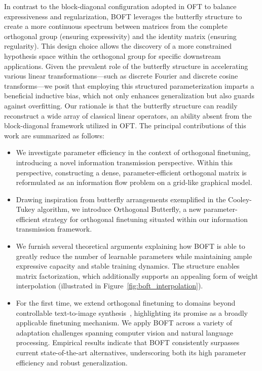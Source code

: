 In contrast to the block-diagonal configuration adopted in OFT to balance expressiveness and regularization, BOFT leverages the butterfly structure to create a more continuous spectrum between matrices from the complete orthogonal group (ensuring expressivity) and the identity matrix (ensuring regularity). This design choice allows the discovery of a more constrained hypothesis space within the orthogonal group for specific downstream applications. Given the prevalent role of the butterfly structure in accelerating various linear transformations—such as discrete Fourier and discrete cosine transforms—we posit that employing this structured parameterization imparts a beneficial inductive bias, which not only enhances generalization but also guards against overfitting. Our rationale is that the butterfly structure can readily reconstruct a wide array of classical linear operators, an ability absent from the block-diagonal framework utilized in OFT. The principal contributions of this work are summarized as follows:

\begin{itemize}[leftmargin=*,nosep]
    \item We investigate parameter efficiency in the context of orthogonal finetuning, introducing a novel information transmission perspective. Within this perspective, constructing a dense, parameter-efficient orthogonal matrix is reformulated as an information flow problem on a grid-like graphical model.
    \item Drawing inspiration from butterfly arrangements exemplified in the Cooley-Tukey algorithm, we introduce Orthogonal Butterfly, a new parameter-efficient strategy for orthogonal finetuning situated within our information transmission framework.
    \item We furnish several theoretical arguments explaining how BOFT is able to greatly reduce the number of learnable parameters while maintaining ample expressive capacity and stable training dynamics. The structure enables matrix factorization, which additionally supports an appealing form of weight interpolation (illustrated in Figure~\ref{fig:boft_interpolation}).
    \item For the first time, we extend orthogonal finetuning to domains beyond controllable text-to-image synthesis~\cite{qiu2023controlling}, highlighting its promise as a broadly applicable finetuning mechanism. We apply BOFT across a variety of adaptation challenges spanning computer vision and natural language processing. Empirical results indicate that BOFT consistently surpasses current state-of-the-art alternatives, underscoring both its high parameter efficiency and robust generalization.
\end{itemize}

